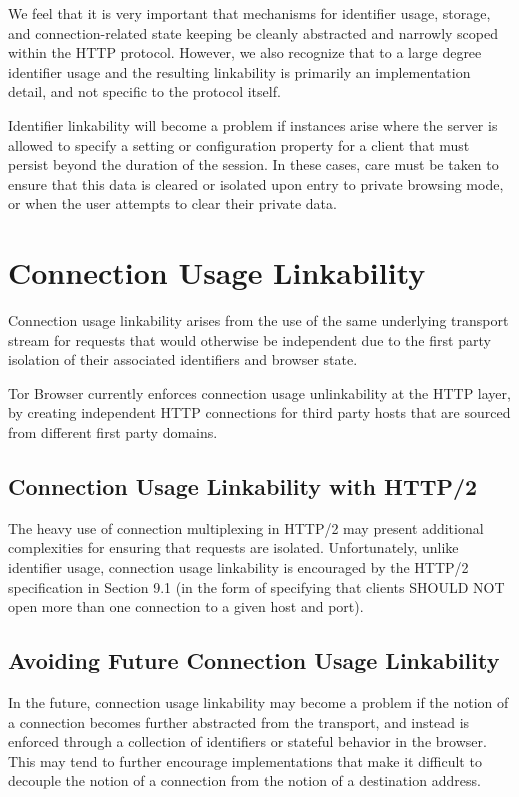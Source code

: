 \documentclass[letterpaper,11pt]{llncs}
\begin{document}
We feel that it is very important that mechanisms for identifier usage,
storage, and connection-related state keeping be cleanly abstracted and
narrowly scoped within the HTTP protocol. However, we also recognize that to a
large degree identifier usage and the resulting linkability is primarily an
implementation detail, and not specific to the protocol itself.

Identifier linkability will become a problem if instances arise where the
server is allowed to specify a setting or configuration property for a client
that must persist beyond the duration of the session. In these cases, care
must be taken to ensure that this data is cleared or isolated upon entry to
private browsing mode, or when the user attempts to clear their private data.


\section{Connection Usage Linkability}

Connection usage linkability arises from the use of the same underlying
transport stream for requests that would otherwise be independent due to the
first party isolation of their associated identifiers and browser state.

Tor Browser currently enforces connection usage unlinkability at the HTTP
layer, by creating independent HTTP connections for third party hosts that
are sourced from different first party domains.

\subsection{Connection Usage Linkability with HTTP/2}

The heavy use of connection multiplexing in HTTP/2 may present additional
complexities for ensuring that requests are isolated. Unfortunately, unlike
identifier usage, connection usage linkability is encouraged by the
HTTP/2 specification in Section 9.1 (in the form of specifying that clients
SHOULD NOT open more than one connection to a given host and port).

\subsection{Avoiding Future Connection Usage Linkability}

In the future, connection usage linkability may become a problem if the notion
of a connection becomes further abstracted from the transport, and instead is
enforced through a collection of identifiers or stateful behavior in the
browser. This may tend to further encourage implementations that make it
difficult to decouple the notion of a connection from the notion of a
destination address.
\end{document}
